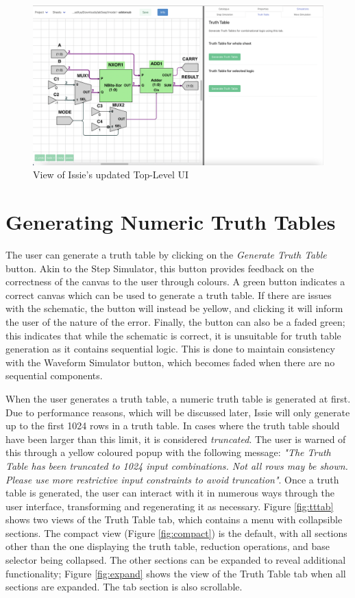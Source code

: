 \begin{figure}[h]
    \centering
    \includegraphics[width=\textwidth]{04.AnalysisDesign/Issieview.png}
    \caption{View of Issie's updated Top-Level UI}
    \label{fig:issieview}
\end{figure}

\section{Generating Numeric Truth Tables}
The user can generate a truth table by clicking on the \textit{Generate Truth Table} button. Akin to the Step Simulator, this button provides feedback on the correctness of the canvas to the user through colours. A green button indicates a correct canvas which can be used to generate a truth table. If there are issues with the schematic, the button will instead be yellow, and clicking it will inform the user of the nature of the error. Finally, the button can also be a faded green; this indicates that while the schematic is correct, it is unsuitable for truth table generation as it contains sequential logic. This is done to maintain consistency with the Waveform Simulator button, which becomes faded when there are no sequential components.

When the user generates a truth table, a numeric truth table is generated at first. Due to performance reasons, which will be discussed later, Issie will only generate up to the first 1024 rows in a truth table. In cases where the truth table should have been larger than this limit, it is considered \textit{truncated}. The user is warned of this through a yellow coloured popup with the following message: \textit{"The Truth Table has been truncated to 1024 input combinations. Not all rows may be shown. Please use more restrictive input constraints to avoid truncation"}. Once a truth table is generated, the user can interact with it in numerous ways through the user interface, transforming and regenerating it as necessary. Figure \ref{fig:tttab} shows two views of the Truth Table tab, which contains a menu with collapsible sections. The compact view (Figure \ref{fig:compact}) is the default, with all sections other than the one displaying the truth table, reduction operations, and base selector being collapsed. The other sections can be expanded to reveal additional functionality; Figure \ref{fig:expand} shows the view of the Truth Table tab when all sections are expanded. The tab section is also scrollable.


